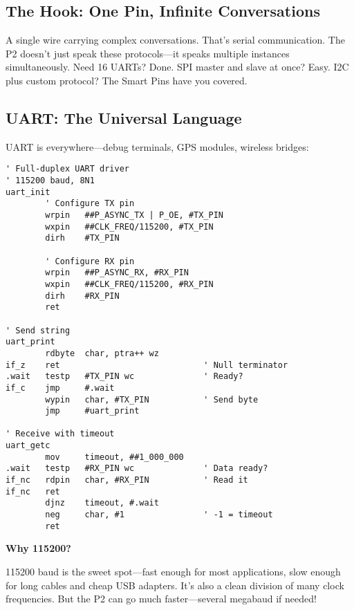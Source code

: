 \documentclass[11pt]{book}
\begin{document}
\hypertarget{the-hook-one-pin-infinite-conversations}{%
\subsection{The Hook: One Pin, Infinite
Conversations}\label{the-hook-one-pin-infinite-conversations}}

A single wire carrying complex conversations. That's serial
communication. The P2 doesn't just speak these protocols---it speaks
multiple instances simultaneously. Need 16 UARTs? Done. SPI master and
slave at once? Easy. I2C plus custom protocol? The Smart Pins have you
covered.

\hypertarget{uart-the-universal-language}{%
\subsection{UART: The Universal
Language}\label{uart-the-universal-language}}

UART is everywhere---debug terminals, GPS modules, wireless bridges:

\begin{lstlisting}
' Full-duplex UART driver
' 115200 baud, 8N1
uart_init
        ' Configure TX pin
        wrpin   ##P_ASYNC_TX | P_OE, #TX_PIN
        wxpin   ##CLK_FREQ/115200, #TX_PIN
        dirh    #TX_PIN
        
        ' Configure RX pin
        wrpin   ##P_ASYNC_RX, #RX_PIN
        wxpin   ##CLK_FREQ/115200, #RX_PIN
        dirh    #RX_PIN
        ret

' Send string
uart_print
        rdbyte  char, ptra++ wz
if_z    ret                             ' Null terminator
.wait   testp   #TX_PIN wc              ' Ready?
if_c    jmp     #.wait
        wypin   char, #TX_PIN           ' Send byte
        jmp     #uart_print

' Receive with timeout
uart_getc
        mov     timeout, ##1_000_000
.wait   testp   #RX_PIN wc              ' Data ready?
if_nc   rdpin   char, #RX_PIN           ' Read it
if_nc   ret
        djnz    timeout, #.wait
        neg     char, #1                ' -1 = timeout
        ret
\end{lstlisting}

\begin{sidetrack}
\textbf{Why 115200?}

115200 baud is the sweet spot—fast enough for most applications, slow enough for long cables and cheap USB adapters. It's also a clean division of many clock frequencies. But the P2 can go much faster—several megabaud if needed!
\end{sidetrack}
\end{document}
